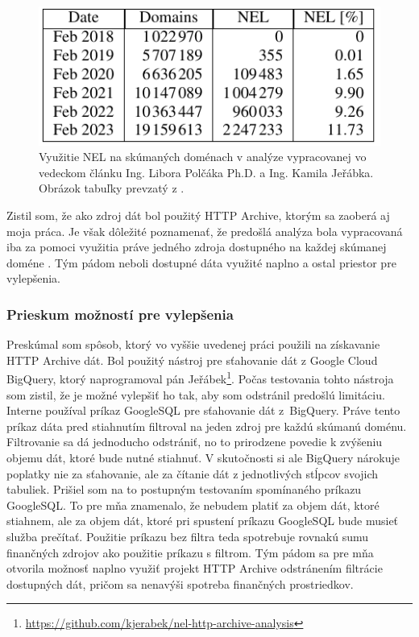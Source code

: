 \begin{figure}[!htb]
\begin{center}
    \includegraphics[width=0.55\linewidth]{obrazky-figures/polcak-analysis-hd.pdf}
    \caption{Využitie NEL na skúmaných doménach v analýze vypracovanej vo vedeckom článku Ing. Libora Polčáka Ph.D. a Ing. Kamila Jeřábka. Obrázok tabuľky prevzatý z \cite{nel-http-archive}.}
    \label{fig:polcak-analysis}
\end{center}
\end{figure}

\pagebreak

Zistil som, že ako zdroj dát bol použitý HTTP Archive, ktorým sa zaoberá aj moja práca.
Je však dôležité poznamenať, že predošlá analýza bola vypracovaná iba za pomoci využitia 
práve jedného zdroja dostupného na každej skúmanej doméne \cite{nel-http-archive}.
Tým pádom neboli dostupné dáta využité naplno a ostal priestor pre vylepšenia.

\subsubsection{Prieskum možností pre vylepšenia}

Preskúmal som spôsob, ktorý vo vyššie uvedenej práci použili na získavanie HTTP Archive dát.
Bol použitý nástroj pre sťahovanie dát z Google Cloud BigQuery, ktorý naprogramoval pán 
Jeřábek\footnote{\url{https://github.com/kjerabek/nel-http-archive-analysis}}.
Počas testovania tohto nástroja som zistil, že je možné vylepšiť ho tak, aby som odstránil predošlú limitáciu.
Interne používal príkaz GoogleSQL pre sťahovanie dát \mbox{z BigQuery}.
Práve tento príkaz dáta pred stiahnutím filtroval na jeden zdroj pre každú skúmanú doménu.
Filtrovanie sa dá jednoducho odstrániť, no to prirodzene povedie k zvýšeniu objemu dát, ktoré bude nutné stiahnuť.
V skutočnosti si ale BigQuery nárokuje poplatky nie za sťahovanie, ale za čítanie dát z jednotlivých stĺpcov svojich tabuliek.
Prišiel som na to postupným testovaním spomínaného príkazu GoogleSQL.
To pre mňa znamenalo, že nebudem platiť za objem dát, ktoré stiahnem, ale za objem dát, ktoré pri spustení príkazu GoogleSQL bude musieť služba prečítať.
Použitie príkazu bez filtra teda spotrebuje rovnakú sumu finančných zdrojov ako použitie príkazu s filtrom.
Tým pádom sa pre mňa otvorila možnosť naplno využiť projekt HTTP Archive odstránením filtrácie dostupných dát, pričom sa nenavýši spotreba finančných prostriedkov.

